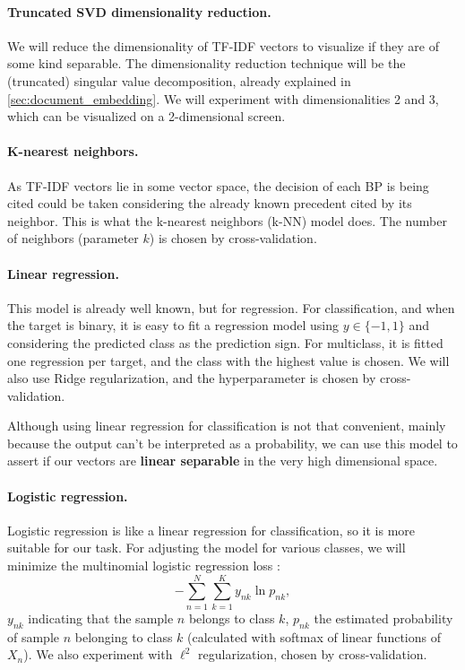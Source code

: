 \documentclass[twocolumn]{article}
\begin{document}
                  \paragraph{Truncated SVD dimensionality reduction.} We will reduce the dimensionality of TF-IDF vectors to visualize if they are of some kind separable. The dimensionality reduction technique will be the (truncated) singular value decomposition, already explained in \autoref{sec:document_embedding}. We will experiment with dimensionalities 2 and 3, which can be visualized on a 2-dimensional screen.

                  \paragraph{K-nearest neighbors.} As TF-IDF vectors lie in some vector space, the decision of each BP is being cited could be taken considering the already known precedent cited by its neighbor. This is what the k-nearest neighbors (k-NN) model does. The number of neighbors (parameter $k$) is chosen by cross-validation.

                  \paragraph{Linear regression.} This model is already well known, but for regression. For classification, and when the target is binary, it is easy to fit a regression model using $y \in \{-1, 1\}$ and considering the predicted class as the prediction sign. For multiclass, it is fitted one regression per target, and the class with the highest value is chosen. We will also use Ridge regularization, and the hyperparameter is chosen by cross-validation.

                  Although using linear regression for classification is not that convenient, mainly because the output can't be interpreted as a probability, we can use this model to assert if our vectors are \textbf{linear separable} in the very high dimensional space.

                  \paragraph{Logistic regression.} Logistic regression is like a linear regression for classification, so it is more suitable for our task. For adjusting the model for various classes, we will minimize the multinomial logistic regression loss \cite{bishop2006pattern}:
                  \[- \sum_{n=1}^N \sum_{k=1}^K y_{nk} \ln p_{nk},\]                  
                  $y_{nk}$ indicating that the sample $n$ belongs to class $k$, $p_{nk}$ the estimated probability of sample $n$ belonging to class $k$ (calculated with softmax of linear functions of $X_n$). We also experiment with $\ell^2$ regularization, chosen by cross-validation.
\end{document}

